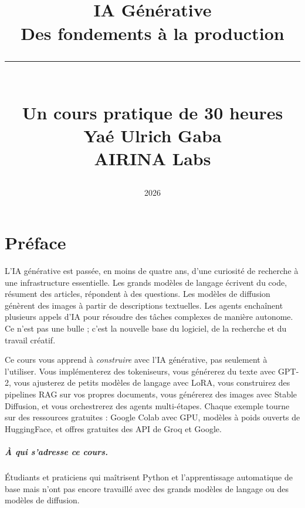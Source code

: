 \documentclass[12pt,a4paper,twoside]{book}
\title{%
  \vspace{-1.5cm}
  \NNmotif\\[18pt]
  {\Huge\bfseries\color{aiblue} IA Générative}\\[8pt]
  {\LARGE Des fondements à la production}\\[14pt]
  \textcolor{aiblue!60}{\rule{0.45\textwidth}{0.6pt}}\\[14pt]
  {\large Un cours pratique de 30 heures}\\[20pt]
  {\normalsize Yaé Ulrich Gaba}\\[4pt]
  {\small AIRINA Labs}%
}
\date{2026}
\author{}
\begin{document}
\frontmatter
\maketitle

\tableofcontents
\newpage

\chapter*{Pr\'eface}

L'IA g\'en\'erative est pass\'ee, en moins de quatre ans, d'une curiosit\'e de recherche \`a une infrastructure essentielle. Les grands mod\`eles de langage \'ecrivent du code, r\'esument des articles, r\'epondent \`a des questions. Les mod\`eles de diffusion g\'en\`erent des images \`a partir de descriptions textuelles. Les agents encha\^inent plusieurs appels d'IA pour r\'esoudre des t\^aches complexes de mani\`ere autonome. Ce n'est pas une bulle ; c'est la nouvelle base du logiciel, de la recherche et du travail cr\'eatif.

Ce cours vous apprend \`a \emph{construire} avec l'IA g\'en\'erative, pas seulement \`a l'utiliser. Vous impl\'ementerez des tokeniseurs, vous g\'en\'ererez du texte avec GPT-2, vous ajusterez de petits mod\`eles de langage avec LoRA, vous construirez des pipelines RAG sur vos propres documents, vous g\'en\'ererez des images avec Stable Diffusion, et vous orchestrerez des agents multi-\'etapes. Chaque exemple tourne sur des ressources gratuites : Google Colab avec GPU, mod\`eles \`a poids ouverts de HuggingFace, et offres gratuites des API de Groq et Google.

\paragraph{\`A qui s'adresse ce cours.} \'Etudiants et praticiens qui ma\^itrisent Python et l'apprentissage automatique de base mais n'ont pas encore travaill\'e avec des grands mod\`eles de langage ou des mod\`eles de diffusion.
\end{document}
